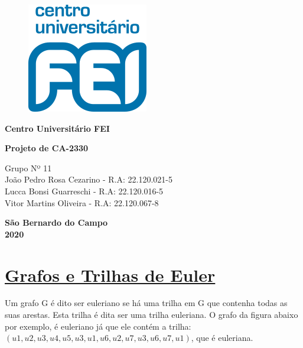 \documentclass{article}
\begin{document}
\begin{titlepage}
	\begin{figure}[H]
		\centering
		\includegraphics[width=0.1\linewidth]{Figuras/logofei}
		\label{fig:logofei}
	\end{figure}
	
	\begin{center}
		{\large \textbf{Centro Universitário FEI} }
	\end{center}
	
	\vspace*{3cm}
	
	\begin{center}
		{\Large {\bf{ Projeto de CA-2330 \\ 
					\vspace*{0.5cm}{\large Relatório - Parte 5}}}}
	\end{center}\vspace*{5cm}
	
	\begin{center}
		Grupo Nº 11 \vspace*{0.2cm} \\ João Pedro Rosa Cezarino - R.A: 22.120.021-5  \\ Lucca Bonsi Guarreschi - R.A: 22.120.016-5  \\ Vitor Martins Oliveira - R.A: 22.120.067-8
	\end{center}
	
	\vspace*{7cm}
	\begin{center} \textbf{São Bernardo do Campo \\ 2020}\end{center}
	
\end{titlepage}
	\newpage
	\setcounter{page}{1} %
	
	\section{{\Large \underline{Grafos e Trilhas de Euler}}}
	Um grafo G é dito ser euleriano se há uma trilha em G que contenha todas as suas arestas. Esta trilha é dita ser uma trilha euleriana. O grafo da figura abaixo por exemplo, é euleriano já que ele contém a trilha: $(u1, u2, u3, u4, u5, u3, u1, u6, u2, u7, u3, u6, u7, u1)$, que é euleriana.\vspace*{0.2cm}
		
\end{document}

